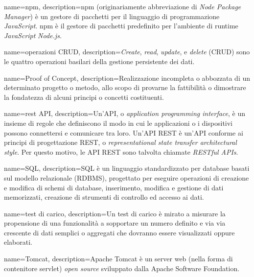 {
    name=npm,
    description={npm (originariamente abbreviazione di \textit{Node Package Manager}) è un gestore di pacchetti per il linguaggio di programmazione \textit{JavaScript}. npm è il gestore di pacchetti predefinito per l'ambiente di runtime \textit{JavaScript} \textit{Node.js.}}
}

{
    name=operazioni CRUD,
    description={\textit{Create}, \textit{read}, \textit{update}, e \textit{delete} (CRUD) sono le quattro operazioni basilari della gestione persistente dei dati.}
}

{
    name=Proof of Concept,
    description={Realizzazione incompleta o abbozzata di un determinato progetto o metodo, allo scopo di provarne la fattibilità o dimostrare la fondatezza di alcuni principi o concetti costituenti.}
}


{
    name=rest API,
    description={Un'API, o \textit{application programming interface}, è un insieme di regole che definiscono il modo in cui le applicazioni o i dispositivi possono connettersi e comunicare tra loro. Un'API REST è un'API conforme ai principi di progettazione REST, o \textit{representational state transfer architectural style}. Per questo motivo, le API REST sono talvolta chiamate \textit{RESTful APIs}.}
}

{
    name=SQL,
    description={SQL è un linguaggio standardizzato per database basati sul modello relazionale (RDBMS), progettato per eseguire operazioni di creazione e modifica di schemi di database, inserimento, modifica e gestione di dati memorizzati, creazione di strumenti di controllo ed accesso ai dati.}
}

{
    name=test di carico,
    description={Un test di carico è mirato a misurare la propensione di una funzionalità a sopportare un numero definito e via via crescente di dati semplici o aggregati che dovranno essere visualizzati oppure elaborati.}
}

{
    name=Tomcat,
    description={Apache Tomcat è un server web (nella forma di contenitore servlet) \textit{open source} sviluppato dalla Apache Software Foundation.}
}

